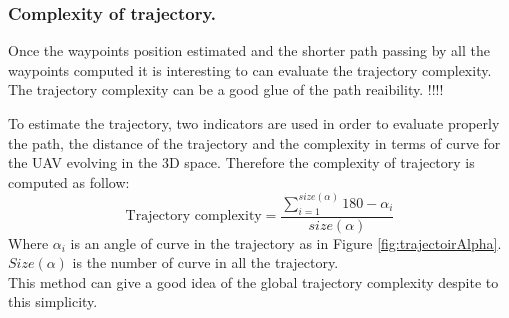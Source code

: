 
 
\subsubsection{Complexity of trajectory. }\label{tarjectory}

Once the waypoints position estimated and the shorter path passing by all the waypoints computed  it is interesting to can evaluate the trajectory complexity. The trajectory complexity can be a good glue of the path reaibility. !!!!
 
To estimate the trajectory, two indicators are used in order to evaluate properly the path, the distance of the trajectory and the complexity in terms of curve for the UAV evolving in the 3D space.
Therefore the complexity of trajectory is computed as follow: 
\begin{equation}\label{Eq:trajectory}
\mbox{Trajectory complexity}=\frac{ \sum_{i=1}^{size(\alpha)} 180- \alpha_{i}  }{size(\alpha)}   
\end{equation}
Where $\alpha_i$ is an angle of curve in the trajectory as in Figure \ref{fig:trajectoirAlpha}. \\
$Size(\alpha)$ is the number of curve in all the trajectory.\\ 
This method  can give a good idea of the global trajectory complexity despite to this simplicity.
	
